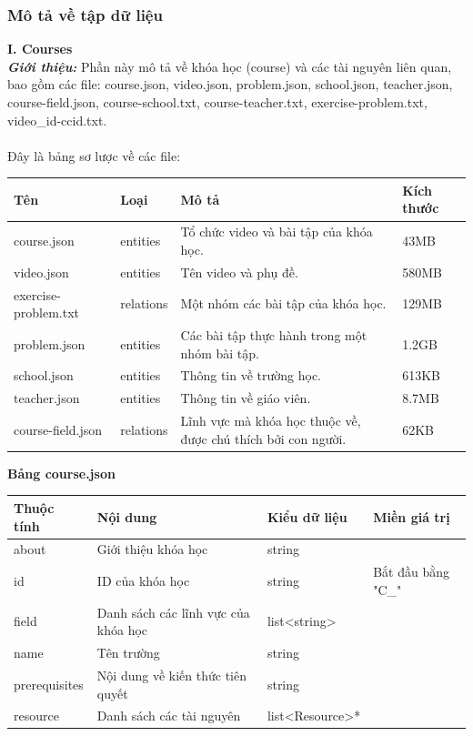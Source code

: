 \subsubsection{Mô tả về tập dữ liệu}
\textbf{I. Courses}\\
\textbf{\textit{Giới thiệu:}} Phần này mô tả về khóa học (course) và các tài nguyên liên quan, bao gồm các file: course.json, video.json, problem.json, school.json, teacher.json, course-field.json, course-school.txt, course-teacher.txt, exercise-problem.txt, video\_id-ccid.txt.\\
\\
Đây là bảng sơ lược về các file:
\begin{center}
\begin{tabular}{|| m{5em}  m{5em}  m{18em}  m{6em}||} 
 \hline
 \textbf{Tên} & \textbf{Loại} & \textbf{Mô tả} & \textbf{Kích thước} \\ [0.5ex] 
 \hline\hline
 course.json & entities & Tổ chức video và bài tập của khóa học. & 43MB \\ 
 \hline
 video.json & entities & Tên video và phụ đề. & 580MB \\
 \hline
 exercise-problem.txt & relations & Một nhóm các bài tập của khóa học. & 129MB \\
 \hline
 problem.json & entities & Các bài tập thực hành trong một nhóm bài tập. & 1.2GB \\
 \hline
 school.json & entities & Thông tin về trường học. & 613KB \\
 \hline
 teacher.json & entities & Thông tin về giáo viên. & 8.7MB \\
 \hline
 course-field.json & relations & Lĩnh vực mà khóa học thuộc về, được chú thích bởi con người. & 62KB \\ [1ex] 
 \hline
\end{tabular}
\end{center}
\newpage
\textbf{Bảng course.json}
\begin{center}
\begin{tabular}{|| m{6em}  m{10em}  m{8em}  m{8em}||} 
 \hline
 \textbf{Thuộc tính} & \textbf{Nội dung} & \textbf{Kiểu dữ liệu} & \textbf{Miền giá trị} \\ [0.5ex] 
 \hline\hline
 about & Giới thiệu khóa học & string &  \\ 
 \hline
 id & ID của khóa học & string & Bắt đầu bằng "C\_" \\
 \hline
 field & Danh sách các lĩnh vực của khóa học & list<string> &  \\
 \hline
 name & Tên trường & string &  \\
 \hline
 prerequisites & Nội dung về kiến thức tiên quyết & string &  \\
 \hline
 resource & Danh sách các tài nguyên & list<Resource>* &  \\ [1ex] 
 \hline
\end{tabular}
\end{center}
